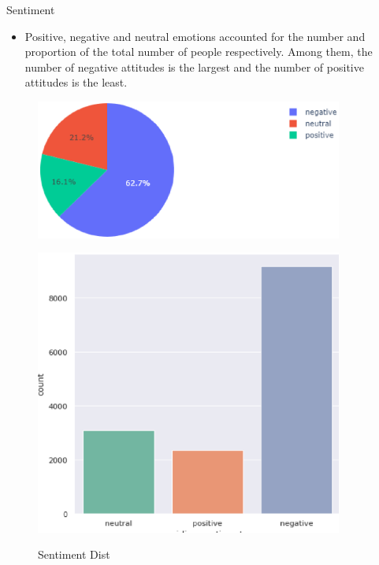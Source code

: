 \documentclass[
 size=14pt,
 paper=smartboard,  %
 mode=present, 		%
 display=slides, 	%
 style=tuliplab,  	%
 pauseslide,
 fleqn,leqno]{powerdot}
\begin{document}
\begin{slide}{Sentiment}
  \begin{itemize}
    \item Positive, negative and neutral emotions accounted for the number and proportion of the total number of people respectively. 
    Among them, the number of negative attitudes is the largest and the number of positive attitudes is the least.
  \end{itemize}
  \begin{figure}[htbp]
    \centering
    \begin{minipage}[t]{0.48\textwidth}
      \centering
      \includegraphics[width=0.9\textwidth]{figures//sentimentmap.eps}\\
      \vspace{-1.4em}
      \caption{Sentiment Map}
    \end{minipage}
    \begin{minipage}[t]{0.48\textwidth}
      \centering
      \includegraphics[width=0.9\textwidth]{figures//sentimentdist.eps}\\
      \vspace{-1.4em}
      \caption{Sentiment Dist}
    \end{minipage}
  \end{figure}
\end{slide}
\end{document}

